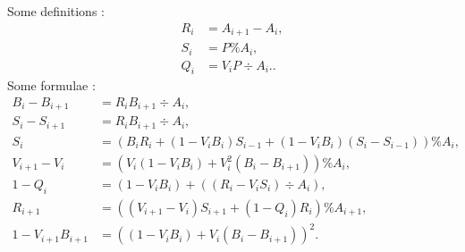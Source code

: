 \documentclass{sig-alternate-2013}
\begin{document}
\begin{lem}
Some definitions :
\begin{align}
R_i &= A_{i+1} -A_i, \label{eqdef:Ri}\\
S_i &= P \% A_i, \label{eqdef:Si} \\
Q_i &= V_i P \div A_i. \label{eqdef:Qi}. 
\end{align}
Some formulae :
\begin{align}
B_i-B_{i+1} &= R_i B_{i+1} \div A_i, \label{eqdef:Biminus} \\
S_i-S_{i+1} &= R_i B_{i+1} \div A_i,  \label{eqdef:Siminus} \\
S_{i} &= (B_i R_i + (1-V_i B_i) S_{i-1}+(1-V_i B_i)(S_i-S_{i-1})) \% A_{i}, \label{eqdef:Si2}  \\
V_{i+1}-V_i &= (V_i (1-V_i B_i)+V_i^2(B_i-B_{i+1})) \% A_{i}, \label{eqdef:Viminus}\\
1-Q_i &= (1-V_i B_i)+((R_i-V_i S_i) \div A_i), \label{eqdef:Qiminus}\\
R_{i+1} &= ((V_{i+1}-V_i)S_{i+1}+(1-Q_i)R_i) \% A_{i+1}, \label{eq:Riplus}\\
1-V_{i+1}B_{i+1} &= ((1-V_i B_i)+V_i (B_i-B_{i+1}))^2. \label{eq:ViBiplus}
\end{align}
\end{lem}
\end{document}

